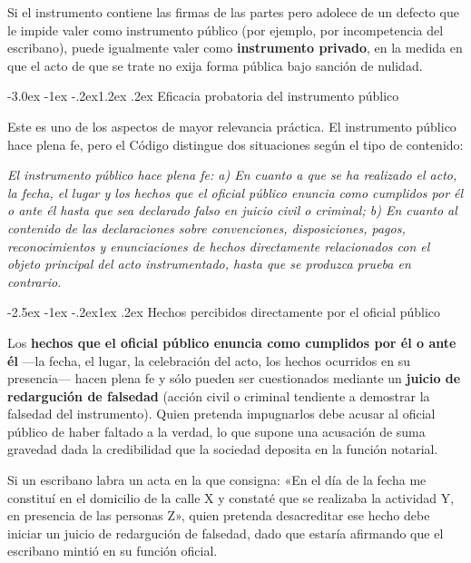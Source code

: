 \documentclass[12pt,oneside]{book}
\makeatletter
\renewcommand\section{\@startsection{section}{1}{\z@}%
  {-3.0ex \@plus -1ex \@minus -.2ex}{1.2ex \@plus .2ex}%
  {\normalfont\large\bfseries\color{acento}}}
\renewcommand\subsection{\@startsection{subsection}{2}{\z@}%
  {-2.5ex \@plus -1ex \@minus -.2ex}{1ex \@plus .2ex}%
  {\normalfont\normalsize\bfseries}}
\makeatother
\begin{document}
\begin{nota}
Si el instrumento contiene las firmas de las partes pero adolece de un defecto que le impide valer como instrumento público (por ejemplo, por incompetencia del escribano), puede igualmente valer como \textbf{instrumento privado}, en la medida en que el acto de que se trate no exija forma pública bajo sanción de nulidad.
\end{nota}

\section{Eficacia probatoria del instrumento público}

Este es uno de los aspectos de mayor relevancia práctica. El instrumento público hace plena fe, pero el Código distingue dos situaciones según el tipo de contenido:

\begin{regla}
\textit{El instrumento público hace plena fe: a) En cuanto a que se ha realizado el acto, la fecha, el lugar y los hechos que el oficial público enuncia como cumplidos por él o ante él hasta que sea declarado falso en juicio civil o criminal; b) En cuanto al contenido de las declaraciones sobre convenciones, disposiciones, pagos, reconocimientos y enunciaciones de hechos directamente relacionados con el objeto principal del acto instrumentado, hasta que se produzca prueba en contrario.}
\end{regla}

\subsection{Hechos percibidos directamente por el oficial público}

Los \textbf{hechos que el oficial público enuncia como cumplidos por él o ante él} ---la fecha, el lugar, la celebración del acto, los hechos ocurridos en su presencia--- hacen plena fe y sólo pueden ser cuestionados mediante un \textbf{juicio de redargución de falsedad} (acción civil o criminal tendiente a demostrar la falsedad del instrumento). Quien pretenda impugnarlos debe acusar al oficial público de haber faltado a la verdad, lo que supone una acusación de suma gravedad dada la credibilidad que la sociedad deposita en la función notarial.

\begin{ejemplo}
Si un escribano labra un acta en la que consigna: «En el día de la fecha me constituí en el domicilio de la calle X y constaté que se realizaba la actividad Y, en presencia de las personas Z», quien pretenda desacreditar ese hecho debe iniciar un juicio de redargución de falsedad, dado que estaría afirmando que el escribano mintió en su función oficial.
\end{ejemplo}
\end{document}
